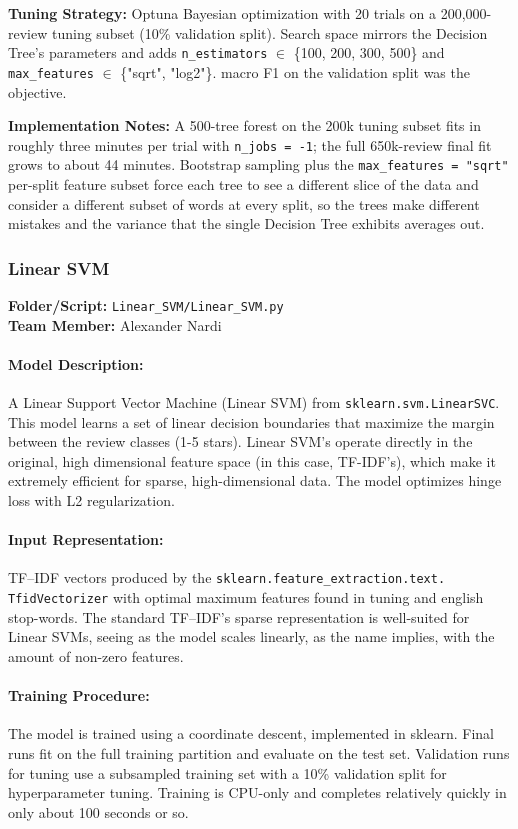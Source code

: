 \documentclass[12pt]{article}
\begin{document}
\textbf{Tuning Strategy:} Optuna Bayesian optimization with 20 trials on a 200,000-review tuning subset (10\% validation split). Search space mirrors the Decision Tree's parameters and adds \texttt{n\_estimators} $\in$ \{100, 200, 300, 500\} and \texttt{max\_features} $\in$ \{"sqrt", "log2"\}. macro F1 on the validation split was the objective.              

\textbf{Implementation Notes:} A 500-tree forest on the 200k tuning subset fits in roughly three minutes per trial with \texttt{n\_jobs = -1}; the full 650k-review final fit grows to about 44 minutes. Bootstrap sampling plus the \texttt{max\_features = "sqrt"} per-split feature subset force each tree to see a different slice of the data and consider a different subset of words at every split, so the trees make different mistakes and the variance that the single Decision Tree exhibits averages out.

\subsubsection{Linear SVM}
\textbf{Folder/Script:} \texttt{Linear\_SVM/Linear\_SVM.py}\\
\textbf{Team Member:} Alexander Nardi

\paragraph{Model Description:} A Linear Support Vector Machine (Linear SVM) from \texttt{sklearn.svm.LinearSVC}. This model learns a set of linear decision boundaries that maximize the margin between the review classes (1-5 stars). Linear SVM's operate directly in the original, high dimensional feature space (in this case, TF-IDF's), which make it extremely efficient for sparse, high-dimensional data. The model optimizes hinge loss with L2 regularization.


\paragraph{Input Representation:} TF--IDF vectors produced by the \texttt{sklearn.feature\_extraction.text. TfidVectorizer} with optimal maximum features found in tuning and english stop-words. The standard TF--IDF's sparse representation is well-suited for Linear SVMs, seeing as the model scales linearly, as the name implies, with the amount of non-zero features.


\paragraph{Training Procedure:} The model is trained using a coordinate descent, implemented in sklearn. Final runs fit on the full training partition and evaluate on the test set. Validation runs for tuning use a subsampled training set with a 10\% validation split for hyperparameter tuning. Training is CPU-only and completes relatively quickly in only about 100 seconds or so.
\end{document}
